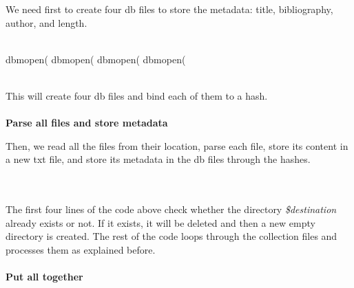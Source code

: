We need first to create four db files to store the metadata: title, bibliography, author, and length.
\\
\\
\begin{boxedverbatim}

   dbmopen(%
   dbmopen(%
   dbmopen(%
   dbmopen(%

\end{boxedverbatim}
\\

This will create four db files and bind each of them to a hash.
\\
\\
\textbf{Parse all files and store metadata}

Then, we read all the files from their location, parse each file, store its content in a new txt file, and store its metadata in the db files through the hashes.
\\
\\
\\

The first four lines of the code above check whether the directory \emph{\$destination} already exists or not. If it exists, it will be deleted and then a new empty directory is created. The rest of the code loops through the collection files and processes them as explained before.
\\
\\
\textbf{Put all together}

